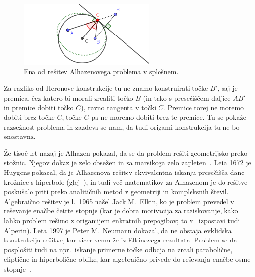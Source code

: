 \begin{figure}[h]
    \centering
    \includegraphics[width=0.6\textwidth]{images/alhazen/alhazen1.png}
    \caption[Alhazenov problem]{Ena od rešitev Alhazenovega problema v splošnem.}
    \label{fig:alhazen1}
\end{figure}

Za razliko od Heronove konstrukcije tu ne znamo konstruirati točke $B'$, saj je premica, čez katero bi morali zrcaliti točko $B$ (in tako s presečiščem daljice $AB'$ in premice dobiti točko $C$), ravno tangenta v točki $C$. Premice torej ne moremo dobiti brez točke $C$, točke $C$ pa ne moremo dobiti brez te premice. Tu se pokaže razsežnost problema in zazdeva se nam, da tudi origami konstrukcija tu ne bo enostavna.


Že tisoč let nazaj je Alhazen pokazal, da se da problem rešiti geometrijsko preko stožnic. Njegov dokaz je zelo obsežen in za marsikoga zelo zapleten~\cite{wilk2015}. Leta 1672 je Huygens pokazal, da je Alhazenova rešitev ekvivalentna iskanju presečišča dane krožnice s hiperbolo (glej~\cite{nishimura2018}), in tudi več matematikov za Alhazenom je do rešitve poskušalo priti preko analitičnih metod v geometriji in kompleksnih števil. Algebraično rešitev je l.\ 1965 našel Jack M.\ Elkin, ko je problem prevedel v reševanje enačbe četrte stopnje (kar je dobra motivacija za raziskovanje, kako lahko problem rešimo z origamijem enkratnih prepogibov; to v~\cite{alperin2002} izpostavi tudi Alperin). Leta 1997 je Peter M.\ Neumann dokazal, da ne obstaja evklidska konstrukcija rešitve, kar sicer vemo že iz Elkinovega rezultata. Problem se da posplošiti tudi na npr.\ iskanje primerne točke odboja na zrcali parabolične, eliptične in hiperbolične oblike, kar algebraično privede do reševanja enačbe osme stopnje~\cite{alhproblemwiki}.

